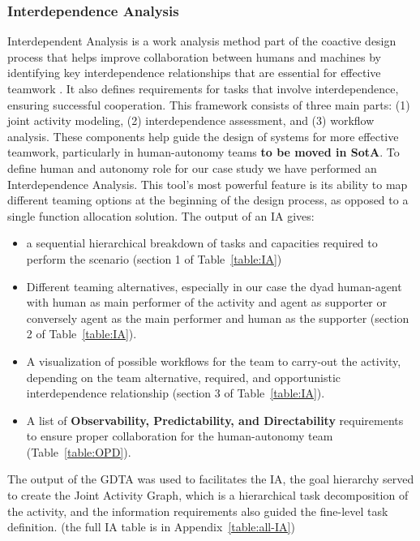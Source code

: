 \documentclass[12pt,a4paper]{article} %
\begin{document}
	\subsubsection{Interdependence Analysis}
	Interdependent Analysis is a work analysis method part of the coactive design process that helps improve collaboration between humans and machines by identifying key interdependence relationships that are essential for effective teamwork \parencite{johnson_coactive_2014}. It also defines requirements for tasks that involve interdependence, ensuring successful cooperation. This framework consists of three main parts: (1) joint activity modeling, (2) interdependence assessment, and (3) workflow analysis. These components help guide the design of systems for more effective teamwork, particularly in human-autonomy teams \parencite{johnson_understanding_2018} \textbf{to be moved in SotA}.
	To define human and autonomy role for our case study we have performed an Interdependence Analysis. This tool's most powerful feature is its ability to map different teaming options at the beginning of the design process, as opposed to a single function allocation solution. The output of an IA gives:
	\begin{itemize}
		\item a sequential hierarchical breakdown of tasks and capacities required to perform the scenario (section 1 of Table~\ref{table:IA})
		\item Different teaming alternatives, especially in our case the dyad human-agent with human as main performer of the activity and agent as supporter or conversely agent as the main performer and human as the supporter (section 2 of Table~\ref{table:IA}).
		\item A visualization of possible workflows for the team to carry-out the activity, depending on the team alternative, required, and opportunistic interdependence relationship (section 3 of Table~\ref{table:IA}).
		\item A list of \textbf{Observability, Predictability, and Directability} requirements to ensure proper collaboration for the human-autonomy team (Table~\ref{table:OPD}).
	\end{itemize}
	The output of the GDTA was used to facilitates the IA, the goal hierarchy served to create the Joint Activity Graph, which is a hierarchical task decomposition of the activity, and the information requirements also guided the fine-level task definition. (the full IA table is in Appendix~\ref{table:all-IA})
	
\end{document}
